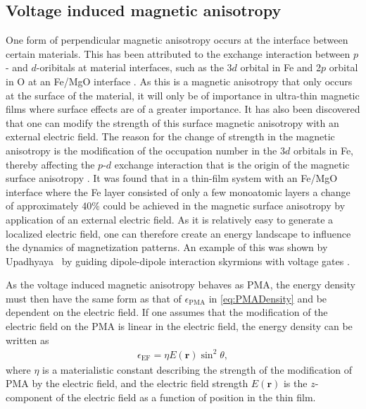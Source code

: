 \subsection{Voltage induced magnetic anisotropy} \label{sec:VIMA}
One form of perpendicular magnetic anisotropy occurs at the interface between certain materials. This has been attributed to the exchange interaction between $p$- and $d$-oribitals at material interfaces, such as the 3$d$ orbital in Fe and 2$p$ orbital in O at an Fe/MgO interface \cite{Matsukura2015}. As this is a magnetic anisotropy that only occurs at the surface of the material, it will only be of importance in ultra-thin magnetic films where surface effects are of a greater importance. It has also been discovered that one can modify the strength of this surface magnetic anisotropy with an external electric field. The reason for the change of strength in the magnetic anisotropy is the modification of the occupation number in the 3$d$ orbitals in Fe, thereby affecting the $p$-$d$ exchange interaction that is the origin of the magnetic surface anisotropy \cite{Maruyama2009}. It was found that in a thin-film system with an Fe/MgO interface where the Fe layer consisted of only a few monoatomic layers a change of approximately 40\% could be achieved in the magnetic surface anisotropy by application of an external electric field. As it is relatively easy to generate a localized electric field, one can therefore create an energy landscape to influence the dynamics of magnetization patterns. An example of this was shown by Upadhyaya \etal~by guiding dipole-dipole interaction skyrmions with voltage gates \cite{Upadhyaya2015}.

As the voltage induced magnetic anisotropy behaves as PMA, the energy density must then have the same form as that of $\epsilon_{\text{PMA}}$ in \eqref{eq:PMADensity} and be dependent on the electric field. If one assumes that the modification of the electric field on the PMA is linear in the electric field, the energy density can be written as
\begin{align}
\epsilon_{\text{EF}} = \eta E(\mathbold{r}) \sin^2\theta,
\end{align}
where $\eta$ is a materialistic constant describing the strength of the modification of PMA by the electric field, and the electric field strength $E(\mathbold{r})$ is the $z$-component of the electric field as a function of position in the thin film. 

